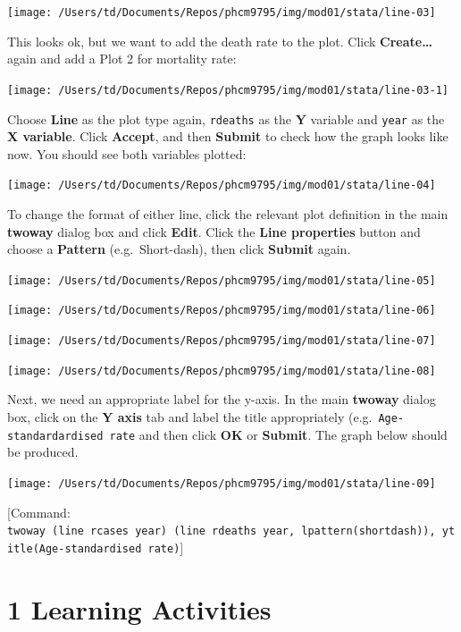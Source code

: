 \documentclass[
]{memoir}
\begin{document}
\texttt{[image: /Users/td/Documents/Repos/phcm9795/img/mod01/stata/line-03]}

This looks ok, but we want to add the death rate to the plot. Click \textbf{Create\ldots{}} again and add a Plot 2 for mortality rate:

\texttt{[image: /Users/td/Documents/Repos/phcm9795/img/mod01/stata/line-03-1]}

Choose \textbf{Line} as the plot type again, \texttt{rdeaths} as the \textbf{Y} variable and \texttt{year} as the \textbf{X variable}. Click \textbf{Accept}, and then \textbf{Submit} to check how the graph looks like now. You should see both variables plotted:

\texttt{[image: /Users/td/Documents/Repos/phcm9795/img/mod01/stata/line-04]}

To change the format of either line, click the relevant plot definition in the main \textbf{twoway} dialog box and click \textbf{Edit}. Click the \textbf{Line properties} button and choose a \textbf{Pattern} (e.g.~Short-dash), then click \textbf{Submit} again.

\texttt{[image: /Users/td/Documents/Repos/phcm9795/img/mod01/stata/line-05]}

\texttt{[image: /Users/td/Documents/Repos/phcm9795/img/mod01/stata/line-06]}

\texttt{[image: /Users/td/Documents/Repos/phcm9795/img/mod01/stata/line-07]}

\texttt{[image: /Users/td/Documents/Repos/phcm9795/img/mod01/stata/line-08]}

Next, we need an appropriate label for the y-axis. In the main \textbf{twoway} dialog box, click on the \textbf{Y axis} tab and label the title appropriately (e.g.~\texttt{Age-standardardised\ rate} and then click \textbf{OK} or \textbf{Submit}. The graph below should be produced.

\texttt{[image: /Users/td/Documents/Repos/phcm9795/img/mod01/stata/line-09]}

{[}Command: \texttt{twoway\ (line\ rcases\ year)\ (line\ rdeaths\ year,\ lpattern(shortdash)),\ ytitle(Age-standardised\ rate)}{]}

\hypertarget{learning-activities}{%
\chapter*{\texorpdfstring{\textbf{1} Learning Activities}{1 Learning Activities}}\label{learning-activities}}
\end{document}
